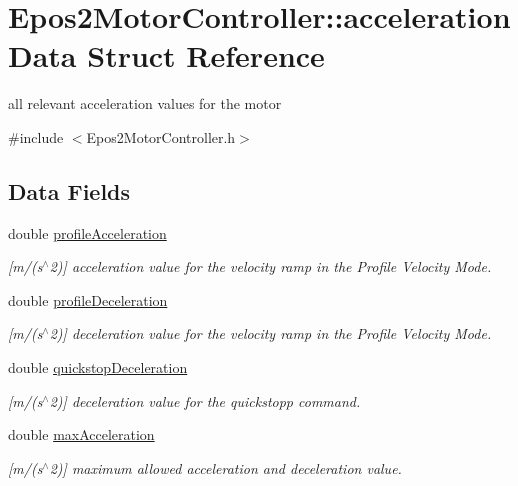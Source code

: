 \hypertarget{structEpos2MotorController_1_1accelerationData}{\section{Epos2\-Motor\-Controller\-:\-:acceleration\-Data Struct Reference}
\label{structEpos2MotorController_1_1accelerationData}
}


all relevant acceleration values for the motor  




{\ttfamily \#include $<$Epos2\-Motor\-Controller.\-h$>$}

\subsection*{Data Fields}
\begin{DoxyCompactItemize}
\item 
double \hyperlink{structEpos2MotorController_1_1accelerationData_a7d5e951aef62b34f0cda8ab6f2233b35}{profile\-Acceleration}
\begin{DoxyCompactList}\small\item\em \mbox{[}m/(s$^\wedge$2)\mbox{]} acceleration value for the velocity ramp in the Profile Velocity Mode. \end{DoxyCompactList}\item 
double \hyperlink{structEpos2MotorController_1_1accelerationData_a72c9997dab624335001a0546dfd6da99}{profile\-Deceleration}
\begin{DoxyCompactList}\small\item\em \mbox{[}m/(s$^\wedge$2)\mbox{]} deceleration value for the velocity ramp in the Profile Velocity Mode. \end{DoxyCompactList}\item 
double \hyperlink{structEpos2MotorController_1_1accelerationData_a50eb2056942ec96cbfc7e67e3e04f5ef}{quickstop\-Deceleration}
\begin{DoxyCompactList}\small\item\em \mbox{[}m/(s$^\wedge$2)\mbox{]} deceleration value for the quickstopp command. \end{DoxyCompactList}\item 
double \hyperlink{structEpos2MotorController_1_1accelerationData_a96bc503d21b47c531df12406a9a80f24}{max\-Acceleration}
\begin{DoxyCompactList}\small\item\em \mbox{[}m/(s$^\wedge$2)\mbox{]} maximum allowed acceleration and deceleration value. \end{DoxyCompactList}\end{DoxyCompactItemize}
